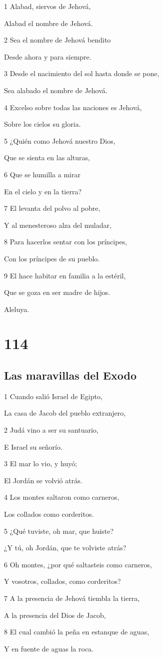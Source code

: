 \par 1 Alabad, siervos de Jehová,
\par Alabad el nombre de Jehová.
\par 2 Sea el nombre de Jehová bendito
\par Desde ahora y para siempre.
\par 3 Desde el nacimiento del sol hasta donde se pone,
\par Sea alabado el nombre de Jehová.
\par 4 Excelso sobre todas las naciones es Jehová,
\par Sobre los cielos su gloria.
\par 5 ¿Quién como Jehová nuestro Dios,
\par Que se sienta en las alturas,
\par 6 Que se humilla a mirar
\par En el cielo y en la tierra?
\par 7 El levanta del polvo al pobre,
\par Y al menesteroso alza del muladar,
\par 8 Para hacerlos sentar con los príncipes,
\par Con los príncipes de su pueblo.
\par 9 El hace habitar en familia a la estéril,
\par Que se goza en ser madre de hijos.
\par Aleluya.

\chapter{114}

\section*{Las maravillas del Exodo}

\par 1 Cuando salió Israel de Egipto,
\par La casa de Jacob del pueblo extranjero,
\par 2 Judá vino a ser su santuario,
\par E Israel su señorío.
\par 3 El mar lo vio, y huyó;
\par El Jordán se volvió atrás.
\par 4 Los montes saltaron como carneros,
\par Los collados como corderitos.
\par 5 ¿Qué tuviste, oh mar, que huiste?
\par ¿Y tú, oh Jordán, que te volviste atrás?
\par 6 Oh montes, ¿por qué saltasteis como carneros,
\par Y vosotros, collados, como corderitos?
\par 7 A la presencia de Jehová tiembla la tierra,
\par A la presencia del Dios de Jacob,
\par 8 El cual cambió la peña en estanque de aguas,
\par Y en fuente de aguas la roca.

